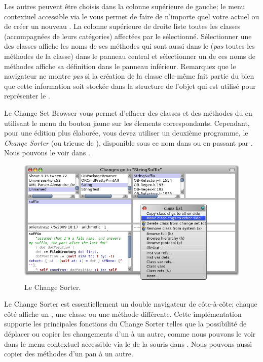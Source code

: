 \documentclass[a4paper,10pt,twoside]{book}
\begin{document}
Les autres \changesets peuvent \^etre choisis dans la colonne sup\'erieure de gauche;
le menu contextuel accessible via le  vous permet de faire de
n'importe quel \changeset votre \changeset actuel ou de cr\'eer un nouveau \changeset.
La colonne sup\'erieure de droite liste toutes les classes 
(accompagn\'ees de leurs cat\'egories) affect\'ees par le \changeset s\'electionn\'e.
S\'electionner une des classes affiche les noms de ses m\'ethodes qui sont aussi dans
le \changeset (\emph{pas} toutes les m\'ethodes de la classe) dans le panneau central
et s\'electionner un de ces noms de m\'ethodes affiche sa d\'efinition dans le panneau
inf\'erieur.
Remarquez que le navigateur ne montre \emph{pas} si la cr\'eation de la classe elle-m\^eme
fait partie du \changeset bien que cette information soit stock\'ee dans la structure
de l'objet qui est utilis\'e pour repr\'esenter le \changeset.

Le Change Set Browser vous permet d'effacer des classes et des m\'ethodes du \changeset
en utilisant le menu du bouton jaune sur les \'elements correspondants. 
Cependant, pour une \'edition plus \'elabor\'ee, vous devez utiliser un deuxi\`eme
programme, le \textit{Change Sorter} (ou trieuse de \changeset), disponible sous ce nom dans 
\toolsflap ou en passant par . Nous
pouvons le voir dans .

\begin{figure}[btp]
	\begin{center}
		\includegraphics[width=\linewidth]{changeSorter}
	\end{center}
	\caption{Le Change Sorter.}
	\label{fig:changeSorter}
\end{figure}

Le Change Sorter est essentiellement un double navigateur de \changeset c\^ote-\`a-c\^ote;
chaque c\^ot\'e affiche un \changeset, une classe ou une m\'ethode diff\'erente.
Cette impl\'ementation supporte les principales fonctions du Change Sorter telles que
la possibilit\'e de d\'eplacer ou copier les changements d'un \changeset \`a un autre,
comme nous pouvons le voir dans le menu contextuel accessible via le 
de la souris dans .
Nous pouvons aussi copier des m\'ethodes d'un pan \`a un autre.
\end{document}
